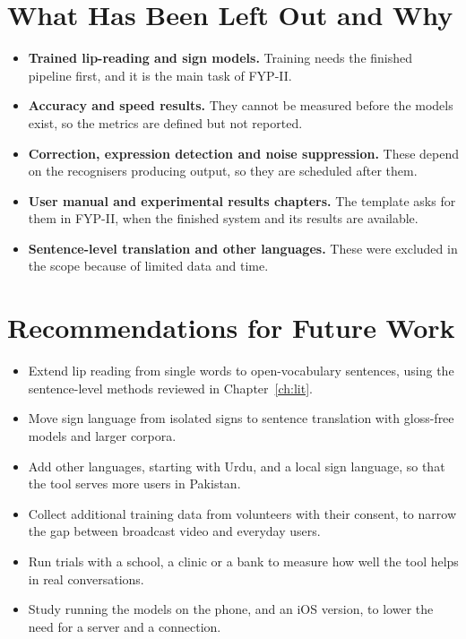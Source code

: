 \documentclass{FastFyp}
\begin{document}
\section{What Has Been Left Out and Why}
\begin{itemize}
  \item \textbf{Trained lip-reading and sign models.} Training needs the finished pipeline first, and it is the main task of FYP-II.
  \item \textbf{Accuracy and speed results.} They cannot be measured before the models exist, so the metrics are defined but not reported.
  \item \textbf{Correction, expression detection and noise suppression.} These depend on the recognisers producing output, so they are scheduled after them.
  \item \textbf{User manual and experimental results chapters.} The template asks for them in FYP-II, when the finished system and its results are available.
  \item \textbf{Sentence-level translation and other languages.} These were excluded in the scope because of limited data and time.
\end{itemize}

\section{Recommendations for Future Work}
\begin{itemize}
  \item Extend lip reading from single words to open-vocabulary sentences, using the sentence-level methods reviewed in Chapter~\ref{ch:lit}.
  \item Move sign language from isolated signs to sentence translation with gloss-free models and larger corpora.
  \item Add other languages, starting with Urdu, and a local sign language, so that the tool serves more users in Pakistan.
  \item Collect additional training data from volunteers with their consent, to narrow the gap between broadcast video and everyday users.
  \item Run trials with a school, a clinic or a bank to measure how well the tool helps in real conversations.
  \item Study running the models on the phone, and an iOS version, to lower the need for a server and a connection.
\end{itemize}
\end{document}
